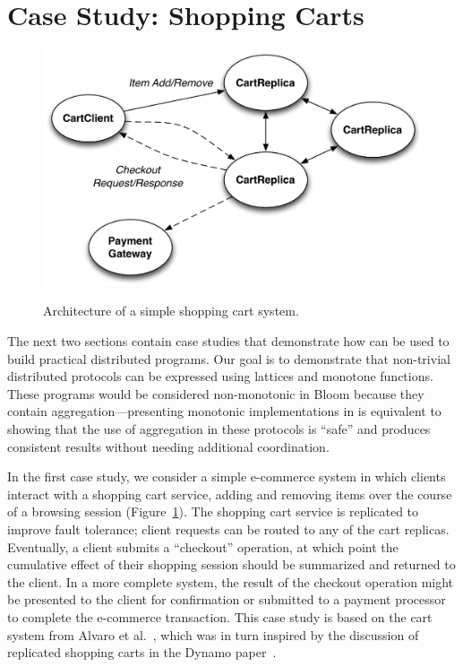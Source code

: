 \section{Case Study: Shopping Carts}
\label{sec:carts}
\begin{figure}[t]
\includegraphics[width=\linewidth]{fig/cart_arch.pdf}
\label{fig:cart-system}
\caption{Architecture of a simple shopping cart system.}
\end{figure}

The next two sections contain case studies that demonstrate how \lang can be
used to build practical distributed programs. Our goal is to demonstrate that
non-trivial distributed protocols can be expressed using lattices and monotone
functions. These programs would be considered non-monotonic in Bloom because
they contain aggregation---presenting monotonic implementations in \lang is
equivalent to showing that the use of aggregation in these protocols is ``safe''
and produces consistent results without needing additional coordination.

In the first case study, we consider a simple e-commerce system in which clients
interact with a shopping cart service, adding and removing items over the course
of a browsing session (Figure~\ref{fig:cart-system}). The shopping cart service
is replicated to improve fault tolerance; client requests can be routed to any
of the cart replicas. Eventually, a client submits a ``checkout'' operation, at
which point the cumulative effect of their shopping session should be summarized
and returned to the client. In a more complete system, the result of the
checkout operation might be presented to the client for confirmation or
submitted to a payment processor to complete the e-commerce transaction. This
case study is based on the cart system from Alvaro et al.~\cite{Alvaro2011},
which was in turn inspired by the discussion of replicated shopping carts in the
Dynamo paper~\cite{DeCandia2007}.

